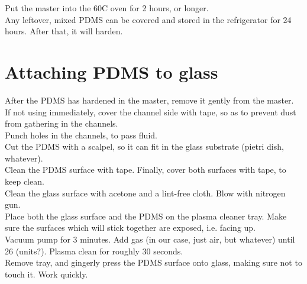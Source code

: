 \documentclass{article}
\begin{document}
Put the master into the 60C oven for 2 hours, or longer.\\

Any leftover, mixed PDMS can be covered and stored in the refrigerator for 24 hours. After that, it will harden.\\

\section{Attaching PDMS to glass}

After the PDMS has hardened in the master, remove it gently from the master.\\

If not using immediately, cover the channel side with tape, so as to prevent dust from gathering in the channels.\\

Punch holes in the channels, to pass fluid.\\

Cut the PDMS with a scalpel, so it can fit in the glass substrate (pietri dish, whatever).\\

Clean the PDMS surface with tape. Finally, cover both surfaces with tape, to keep clean.\\

Clean the glass surface with acetone and a lint-free cloth. Blow with nitrogen gun.\\

Place both the glass surface and the PDMS on the plasma cleaner tray. Make sure the surfaces which will stick together are exposed, i.e. facing up.\\

Vacuum pump for 3 minutes. Add gas (in our case, just air, but whatever) until 26 (units?). Plasma clean for roughly 30 seconds.\\

Remove tray, and gingerly press the PDMS surface onto glass, making sure not to touch it. Work quickly.\\
\end{document}

